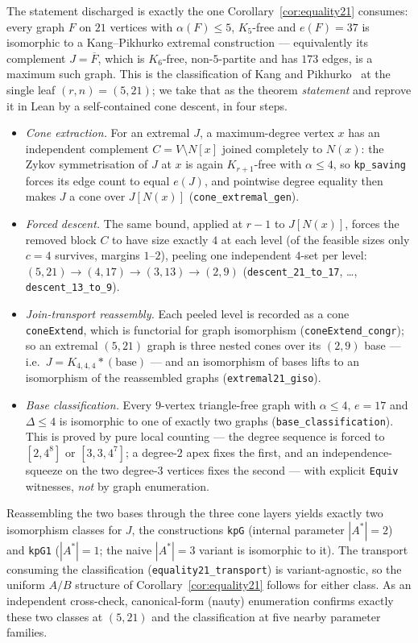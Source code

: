 \documentclass[11pt,reqno]{amsart}
\theoremstyle{definition}
\theoremstyle{remark}
\newcommand{\abs}[1]{\left|#1\right|}
\begin{document}
The statement discharged is exactly the one Corollary~\ref{cor:equality21} consumes:
every graph $F$ on $21$ vertices with $\alpha(F)\le 5$, $K_5$-free and $e(F)=37$ is
isomorphic to a Kang--Pikhurko extremal construction --- equivalently its complement
$J=\overline F$, which is $K_6$-free, non-$5$-partite and has $173$ edges, is a maximum
such graph. This is the classification of Kang and Pikhurko~\cite{KP05} at the single
leaf $(r,n)=(5,21)$; we take that as the theorem \emph{statement} and reprove it in Lean
by a self-contained cone descent, in four steps.
\begin{itemize}[nosep]
\item[\textbf{D1}] \emph{Cone extraction.} For an extremal $J$, a maximum-degree vertex
$x$ has an independent complement $C=V\setminus N[x]$ joined completely to $N(x)$: the
Zykov symmetrisation of $J$ at $x$ is again $K_{r+1}$-free with $\alpha\le 4$, so
\texttt{kp\_saving} forces its edge count to equal $e(J)$, and pointwise degree equality
then makes $J$ a cone over $J[N(x)]$ (\texttt{cone\_extremal\_gen}).
\item[\textbf{D2}] \emph{Forced descent.} The same bound, applied at $r-1$ to
$J[N(x)]$, forces the removed block $C$ to have size exactly $4$ at each level (of the
feasible sizes only $c=4$ survives, margins $1$--$2$), peeling one independent $4$-set
per level: $(5,21)\to(4,17)\to(3,13)\to(2,9)$
(\texttt{descent\_21\_to\_17}, \dots, \texttt{descent\_13\_to\_9}).
\item[\textbf{D3}] \emph{Join-transport reassembly.} Each peeled level is recorded as a
cone \texttt{coneExtend}, which is functorial for graph isomorphism
(\texttt{coneExtend\_congr}); so an extremal $(5,21)$ graph is three nested cones over
its $(2,9)$ base --- i.e.\ $J=K_{4,4,4}\ast(\text{base})$ --- and an isomorphism of bases
lifts to an isomorphism of the reassembled graphs (\texttt{extremal21\_giso}).
\item[\textbf{D4}] \emph{Base classification.} Every $9$-vertex triangle-free graph with
$\alpha\le 4$, $e=17$ and $\Delta\le 4$ is isomorphic to one of exactly two graphs
(\texttt{base\_classification}). This is proved by pure local counting --- the degree
sequence is forced to $[2,4^8]$ or $[3,3,4^7]$; a degree-$2$ apex fixes the first, and
an independence-squeeze on the two degree-$3$ vertices fixes the second --- with
explicit \texttt{Equiv} witnesses, \emph{not} by graph enumeration.
\end{itemize}
Reassembling the two bases through the three cone layers yields exactly two isomorphism
classes for $J$, the constructions \texttt{kpG} (internal parameter $\abs{A^\ast}=2$)
and \texttt{kpG1} ($\abs{A^\ast}=1$; the naive $\abs{A^\ast}=3$ variant is isomorphic to
it). The transport consuming the classification (\texttt{equality21\_transport}) is
variant-agnostic, so the uniform $A/B$ structure of Corollary~\ref{cor:equality21}
follows for either class. As an independent cross-check, canonical-form (nauty)
enumeration confirms exactly these two classes at $(5,21)$ and the classification at
five nearby parameter families.
\end{document}

